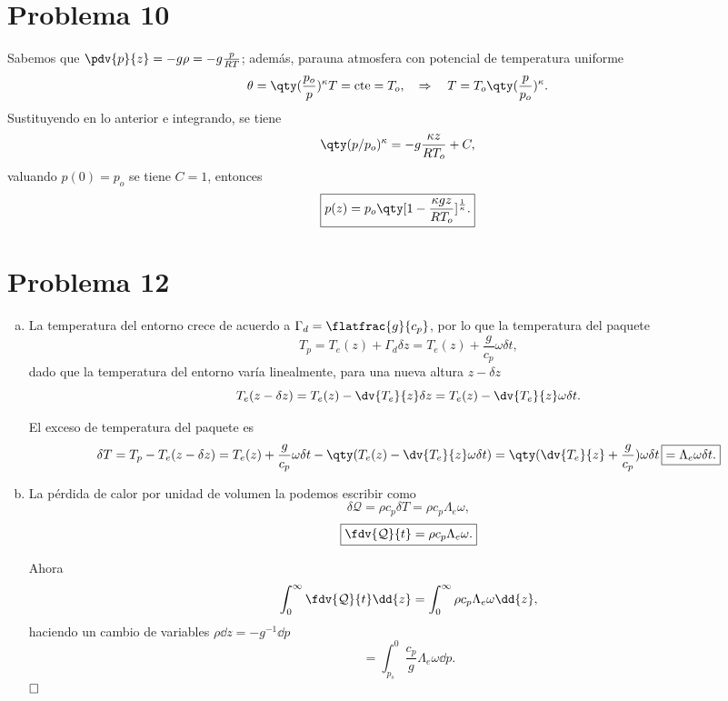 \vspace{0.5cm}


\section*{Problema 10}
Sabemos que $\pdv{p}{z} = -g\rho = -g\frac{p}{RT}$; además, parauna atmosfera con potencial de temperatura uniforme
	$$ \theta = \qty(\frac{p_o}{p})^\kappa T = \text{cte} = T_o, \quad \Rightarrow \quad T = T_o \qty(\frac{p}{p_o})^\kappa . $$
Sustituyendo en lo anterior e integrando, se tiene
	$$ \qty(p/p_o)^\kappa = -g\frac{\kappa z}{RT_o} + C, $$
valuando $p(0) = p_o$ se tiene $C = 1$, entonces
	$$ \boxed{p(z) = p_o \qty[1 - \frac{\kappa gz}{RT_o}]^{\frac{1}{\kappa}} .} $$
	
\section*{Problema 12}

\begin{enumerate}[a)]
	\item La temperatura del entorno crece de acuerdo a $\Gamma _d = \flatfrac{g}{c_p}$, por lo que la temperatura del paquete
	$$ T_{p} = T_e (z) + \Gamma _d \delta z = T_e (z) + \frac{g}{c_p} \omega \delta t, $$
dado que la temperatura del entorno varía linealmente, para una nueva altura $z - \delta z$
	$$ T_e (z - \delta z) = T_e (z) - \dv{T_e}{z} \delta z = T_e (z) - \dv{T_e}{z} \omega \delta t. $$
	

El exceso de temperatura del paquete es
	$$ \delta T = T_p - T_e (z - \delta z) = T_e (z) + \frac{g}{c_p} \omega \delta t - \qty(T_e (z) - \dv{T_e}{z} \omega \delta t) = \qty(\dv{T_e}{z} + \frac{g}{c_p})\omega \delta t \, \boxed{ = \Lambda _e \omega \delta t. } $$
	
	\item La pérdida de calor por unidad de volumen la podemos escribir como
	$$ \delta \mathcal{Q} = \rho c_p \delta T = \rho c_p \Lambda _e \omega, $$
	$$ \boxed{ \fdv{\mathcal{Q}}{t} = \rho c_p \Lambda _e \omega. } $$
	
Ahora
	$$ \int _0 ^\infty \fdv{\mathcal{Q}}{t} \dd{z} = \int _0 ^\infty \rho c_p \Lambda _e \omega \dd{z}, $$
haciendo un cambio de variables $\rho \dd{z} = -g^{-1} \dd{p}$
	$$ = \int _{p_s} ^0 \frac{c_p}{g} \Lambda _e \omega \dd{p}. $$
$\hfill \square$
\end{enumerate}




















